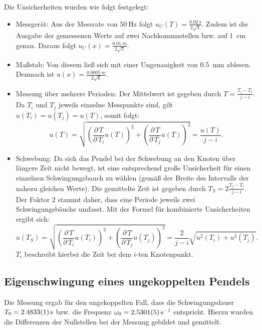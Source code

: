 \documentclass[11pt,a4paper,titlepage, ngerman]{article}
\begin{document}
			Die Unsicherheiten wurden wie folgt festgelegt:
			\begin{itemize}
				\item Messgerät: Aus der Messrate von $\SI{50}{\hertz}$ folgt $u_C(T) = \frac{\SI{0,02}{\second}}{2\sqrt{3}}$.
				Zudem ist die Ausgabe der gemessenen Werte auf zwei Nachkommastellen bzw. auf \SI{1}{\cm} genau. Daraus folgt $u_C(x) = \frac{\SI{0,01}{m}}{2\sqrt{3}}$.
				\item Maßstab: Von diesem ließ sich mit einer Ungenauigkeit von \SI{0,5}{mm} ablesen. Demnach ist $u(x) = \frac{\SI{0,0005}{m}}{2\sqrt{6}}$.
				\item Messung über mehrere Perioden: Der Mittelwert ist gegeben durch $T = \frac{T_j - T_i}{j-i}$.
				Da $T_i$ und $T_j$ jeweils einzelne Messpunkte sind, gilt $u(T_i) = u(T_j) = u(T)$, somit folgt:
				\begin{equation}
					u(T) = \sqrt{\left( \frac{\partial\, T}{\partial\, T_i} u(T)\right)^2 + \left( \frac{\partial\, T}{\partial\, T_j} u(T)\right)^2}
					=\frac{u(T)}{j-i}.
				\end{equation}
				\item Schwebung: Da sich das Pendel bei der Schwebung an den Knoten über längere Zeit nicht bewegt, ist eine entsprechend große Unsicherheit für einen einzelnen Schwingungsbauch zu wählen (gemäß der Breite des Intervalls der nahezu gleichen Werte).
				Die gemittelte Zeit ist gegeben durch $T_S = 2\frac{T_j - T_i}{j-i}$. Der Faktor $2$ stammt daher, dass eine Periode jeweils zwei Schwingungsbäuche umfasst.
				Mit der Formel für kombinierte Unsicherheiten ergibt sich:
				\begin{equation}
					u(T_S) = \sqrt{\left( \frac{\partial\, T}{\partial\, T_i} u(T_i)\right)^2 + \left( \frac{\partial\, T}{\partial\, T_j} u(T_j)\right)^2}
					=\frac{2}{j-i} \sqrt{u^2(T_i) + u^2(T_j)}.
				\end{equation}
				$T_i$ beschreibt hierbei die Zeit bei dem $i$-ten Knotenpunkt.
			\end{itemize}
			
		\subsection{Eigenschwingung eines ungekoppelten Pendels}
										
			Die Messung ergab für den ungekoppelten Fall, dass die Schwingungsdauer $T_0 = \SI{2,4833 +- 0,0001}{\second}$ bzw. die Frequenz $\omega_0 = \SI{2,5301 +- 0,0005}{\s^{-1}}$ entspricht. Hierzu wurden die Differenzen der Nullstellen bei der Messung gebildet und gemittelt. 
			
\end{document}
